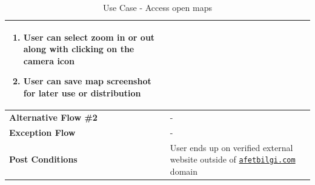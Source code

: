 \begin{table}[H]
\begin{tabular}{|p{.3\linewidth}|p{.7\linewidth}|}
\begin{minipage}[ht]{\linewidth}
\begin{enumerate}[label=\textbf{Step \arabic*:},leftmargin=1.5\leftmargin]
                \item User can select zoom in or out along with clicking on the camera icon
                \item User can save map screenshot for later use or distribution
            \end{enumerate}
        \end{minipage} \\
    \hline
    \textbf{Alternative Flow \#2} & - \\
    \hline
    \textbf{Exception Flow} & - \\
    \hline
    \textbf{Post Conditions} & User ends up on verified external website outside of \href{https://afetbilgi.com}{\texttt{afetbilgi.com}} domain \\
    \hline
  \end{tabular}
  \caption{Use Case - Access open maps}
\end{table}

